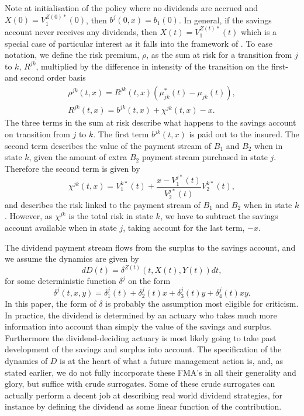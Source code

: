 \documentclass[12pt]{article}
\theoremstyle{my_thm}
\begin{document}
Note at initialisation of the policy where no dividends are accrued and $X(0)=V_1^{Z(0)*}(0)$, then $b^j(0,x)=b_1(0)$. In general, if the savings account never receives any dividends, then $X(t)=V_1^{Z(t)*}(t)$ which is a special case of particular interest as it falls into the framework of \citet{Norberg}. To ease notation, we define the risk premium, $\rho$, as the sum at risk for a transition from $j$ to $k$, $R^{jk}$, multiplied by the difference in intensity of the transition on the first- and second order basis
\begin{gather*}
\rho^{jk}(t,x)=R^{jk}(t,x)(\mu_{jk}^*(t)-\mu_{jk}(t)),
\\
R^{jk}(t,x)=b^{jk}(t,x)+\chi^{jk}(t,x)-x.
\end{gather*}
The three terms in the sum at risk describe what happens to the savings account on transition from $j$ to $k$. The first term $b^{jk}(t,x)$ is paid out to the insured. The second term describes the value of the payment stream of $B_1$ and $B_2$ when in state $k$, given the amount of extra $B_2$ payment stream purchased in state $j$. Therefore the second term is given by
$$
\chi^{jk}(t,x)=V_1^{k*}(t)+\frac{x-V_1^{j*}(t)}{V_2^{j*}(t)}V_2^{k*}(t),
$$
and describes the risk linked to the payment stream of $B_1$ and $B_2$ when in state $k$. However, as $\chi^{jk}$ is the total risk in state $k$, we have to subtract the savings account available when in state $j$, taking account for the last term, $-x$.


The dividend payment stream flows from the surplus to the savings account, and we assume the dynamics are given by
$$
dD(t)=\delta^{Z(t)}(t,X(t),Y(t)) dt,
$$
for some deterministic function $\delta^j$ on the form
\begin{equation*}
\delta^j(t,x,y)=\delta_1^j(t)+\delta_2^j(t)x+\delta_3^j(t)y+\delta_4^j(t)xy.
\end{equation*}
In this paper, the form of $\delta$ is probably the assumption most eligible for criticism. In practice, the dividend is determined by an actuary who takes much more information into account than simply the value of the savings and surplus. Furthermore the dividend-deciding actuary is most likely going to take past development of the savings and surplus into account. The specification of the dynamics of $D$ is at the heart of what a future management action is, and, as stated earlier, we do not fully incorporate these FMA's in all their generality and glory, but suffice with crude surrogates. Some of these crude surrogates can actually perform a decent job at describing real world dividend strategies, for instance by defining the dividend as some linear function of the contribution.
\end{document}
